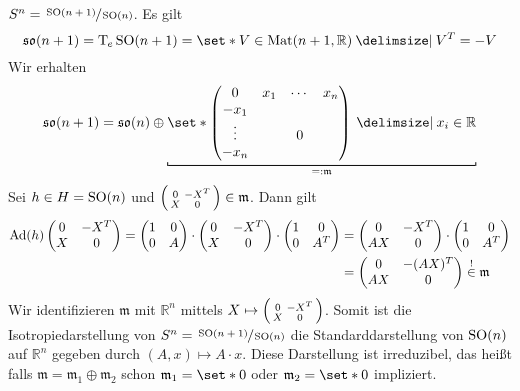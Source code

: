 \begin{beispiel*}
	$S^n = \sfrac{\operatorname{SO}(n+1)}{\operatorname{SO}(n)}$. Es gilt
	\[
		\mathfrak{so}(n+1) = \Tmap_e \SO(n+1) = \set*{V \in \Mat(n+1,\mathbb{R}) \given V^T = -V}
	\]
	Wir erhalten 
	\[
		\mathfrak{so}(n+1) = \mathfrak{so}(n) \oplus  \Underbracket{\set*{\begin{pmatrix}
			0 & x_1 & \cdots & x_n \\
			-x_1 & & & \\
			\vdots & & 0 & \\
			-x_n & & & 
		\end{pmatrix} \given x_i \in \mathbb{R}}}{=: \mathfrak{m}}
	\]
	Sei $h \in H = \operatorname{SO}(n)$ und $\begin{psmallmatrix}
		0 & -X^T \\ X & 0
	\end{psmallmatrix} \in \mathfrak{m}$.
	Dann gilt 
	\begin{align}
			\operatorname{Ad}(h) \begin{pmatrix}
			0 & -X^T \\ X & 0
		\end{pmatrix} = \begin{pmatrix}
			1 & 0 \\ 0 & A
		\end{pmatrix} \cdot \begin{pmatrix}
			0 & -X^T \\ X & 0
		\end{pmatrix} \cdot \begin{pmatrix}
			1 & 0 \\
			0 & A^T
		\end{pmatrix} &= \begin{pmatrix}
			0 & - X^T \\ AX & 0 
		\end{pmatrix} \cdot \begin{pmatrix}
			1 & 0 \\ 0 & A^T
		\end{pmatrix} \\
		&= \begin{pmatrix}
			0 & -(AX)^T \\ AX & 0
		\end{pmatrix} 
		\stackrel{!}{\in } \mathfrak{m}
	\end{align}
	Wir identifizieren $\mathfrak{m}$ mit $\mathbb{R}^n$ mittels $X \mapsto \begin{psmallmatrix}
		0 & -X^T \\ X & 0
	\end{psmallmatrix}$.
	Somit ist die Isotropiedarstellung von $S^n = \sfrac{\operatorname{SO}(n+1)}{\operatorname{SO}(n)}$ die Standarddarstellung von $\operatorname{SO}(n)$ auf $\mathbb{R}^n$ gegeben durch $(A,x) \mapsto A \cdot x$.
	Diese Darstellung ist irreduzibel, das heißt falls $\mathfrak{m} = \mathfrak{m}_1 \oplus \mathfrak{m}_2$ schon $\mathfrak{m}_1= \set*{0}$ oder $\mathfrak{m}_2 =\set*{0}$ impliziert.
\end{beispiel*}

